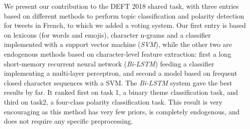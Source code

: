 
We present our contribution to the DEFT 2018 shared task, with three entries based on different methods to perform topic classification and polarity detection for tweets in French, to which we added a voting system.
Our first entry is based on lexicons (for words and emojis), character n-grams and a classifier implemented with a support vector machine (\textit{SVM}), while the other two are endogenous methods based on character-level feature extraction: first a long short-memory recurrent neural network (\textit{Bi-LSTM}) feeding a classifier implementing a multi-layer perceptron, and second a model based on frequent closed character sequences with a {SVM}.
The \textit{Bi-LSTM} system gave the best results by far.
It ranked first on task 1, a binary theme classification task, and third on task2, a four-class polarity classification task.
This result is very encouraging as this method has very few priors, is completely endogenous, and does not require any specific preprocessing.



